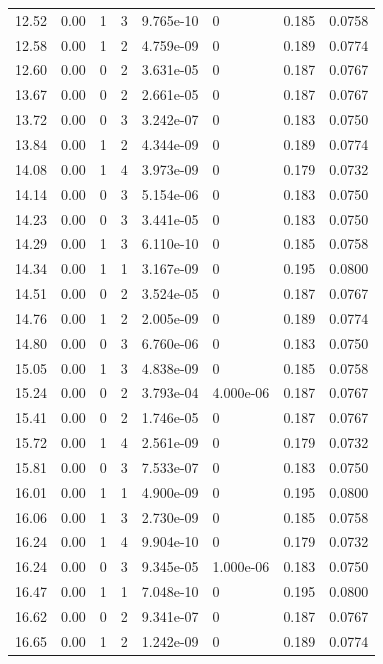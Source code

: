 \documentclass[preview]{standalone}
\begin{document}
{{{\begin{tabular}{L{1.2cm}C{1.2cm} C{0.3cm}C{0.5cm} C{1.4cm}C{1.4cm} C{1.4cm}C{1.4cm}}
  12.52  &  0.00  & 1     &  3 &  9.765e-10  & 0  & 0.185 &  0.0758   \\ 
  12.58  &  0.00  & 1     &  2 &  4.759e-09  & 0  & 0.189 &  0.0774   \\ 
  12.60  &  0.00  & 0     &  2 &  3.631e-05  & 0  & 0.187 &  0.0767   \\ 
  13.67  &  0.00  & 0     &  2 &  2.661e-05  & 0  & 0.187 &  0.0767   \\ 
  13.72  &  0.00  & 0     &  3 &  3.242e-07  & 0  & 0.183 &  0.0750   \\ 
  13.84  &  0.00  & 1     &  2 &  4.344e-09  & 0  & 0.189 &  0.0774   \\ 
  14.08  &  0.00  & 1     &  4 &  3.973e-09  & 0  & 0.179 &  0.0732   \\ 
  14.14  &  0.00  & 0     &  3 &  5.154e-06  & 0  & 0.183 &  0.0750   \\ 
  14.23  &  0.00  & 0     &  3 &  3.441e-05  & 0  & 0.183 &  0.0750   \\ 
  14.29  &  0.00  & 1     &  3 &  6.110e-10  & 0  & 0.185 &  0.0758   \\ 
  14.34  &  0.00  & 1     &  1 &  3.167e-09  & 0  & 0.195 &  0.0800   \\ 
  14.51  &  0.00  & 0     &  2 &  3.524e-05  & 0  & 0.187 &  0.0767   \\ 
  14.76  &  0.00  & 1     &  2 &  2.005e-09  & 0  & 0.189 &  0.0774   \\ 
  14.80  &  0.00  & 0     &  3 &  6.760e-06  & 0  & 0.183 &  0.0750   \\ 
  15.05  &  0.00  & 1     &  3 &  4.838e-09  & 0  & 0.185 &  0.0758   \\ 
  15.24  &  0.00  & 0     &  2 &  3.793e-04  & 4.000e-06  & 0.187 &  0.0767   \\ 
  15.41  &  0.00  & 0     &  2 &  1.746e-05  & 0  & 0.187 &  0.0767   \\ 
  15.72  &  0.00  & 1     &  4 &  2.561e-09  & 0  & 0.179 &  0.0732   \\ 
  15.81  &  0.00  & 0     &  3 &  7.533e-07  & 0  & 0.183 &  0.0750   \\ 
  16.01  &  0.00  & 1     &  1 &  4.900e-09  & 0  & 0.195 &  0.0800   \\ 
  16.06  &  0.00  & 1     &  3 &  2.730e-09  & 0  & 0.185 &  0.0758   \\ 
  16.24  &  0.00  & 1     &  4 &  9.904e-10  & 0  & 0.179 &  0.0732   \\ 
  16.24  &  0.00  & 0     &  3 &  9.345e-05  & 1.000e-06  & 0.183 &  0.0750   \\ 
  16.47  &  0.00  & 1     &  1 &  7.048e-10  & 0  & 0.195 &  0.0800   \\ 
  16.62  &  0.00  & 0     &  2 &  9.341e-07  & 0  & 0.187 &  0.0767   \\ 
  16.65  &  0.00  & 1     &  2 &  1.242e-09  & 0  & 0.189 &  0.0774   \\ 
\hline 
\end{tabular} 

}}}
\end{document}
